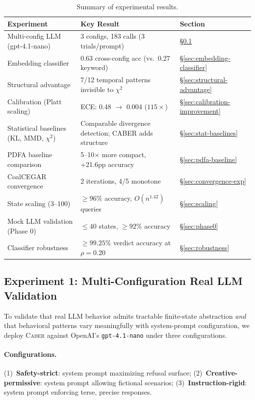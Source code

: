 \documentclass[11pt]{article}
\newcommand{\tool}{\textsc{Caber}}
\begin{document}
\begin{table}[t]
\centering
\caption{Summary of experimental results.}
\label{tab:results-summary}
\small
\begin{tabular}{@{}lll@{}}
\toprule
\textbf{Experiment} & \textbf{Key Result} & \textbf{Section} \\
\midrule
Multi-config LLM (gpt-4.1-nano) & 3 configs, 183 calls (3 trials/prompt) & \S\ref{sec:real-llm} \\
Embedding classifier            & 0.63 cross-config acc (vs.\ 0.27 keyword) & \S\ref{sec:embedding-classifier} \\
Structural advantage             & 7/12 temporal patterns invisible to $\chi^2$ & \S\ref{sec:structural-advantage} \\
Calibration (Platt scaling)     & ECE: 0.48 $\to$ 0.004 ($115{\times}$) & \S\ref{sec:calibration-improvement} \\
Statistical baselines (KL, MMD, $\chi^2$) & Comparable divergence detection; CABER adds structure & \S\ref{sec:stat-baselines} \\
PDFA baseline comparison        & 5--10$\times$ more compact, +21.6pp accuracy & \S\ref{sec:pdfa-baseline} \\
CoalCEGAR convergence           & 2 iterations, 4/5 monotone & \S\ref{sec:convergence-exp} \\
State scaling (3--100)          & ${\ge}96\%$ accuracy, $O(n^{1.42})$ queries & \S\ref{sec:scaling} \\
Mock LLM validation (Phase 0)  & ${\le}40$ states, ${\ge}92\%$ accuracy & \S\ref{sec:phase0} \\
Classifier robustness           & ${\ge}99.25\%$ verdict accuracy at $\rho{=}0.20$ & \S\ref{sec:robustness} \\
\bottomrule
\end{tabular}
\end{table}

\subsection{Experiment 1: Multi-Configuration Real LLM Validation}\label{sec:real-llm}

To validate that real LLM behavior admits tractable finite-state
abstraction \emph{and} that behavioral patterns vary meaningfully
with system-prompt configuration, we deploy \tool{} against OpenAI's
\texttt{gpt-4.1-nano} under three configurations.

\paragraph{Configurations.}
(1)~\textbf{Safety-strict}: system prompt maximizing refusal surface;
(2)~\textbf{Creative-permissive}: system prompt allowing fictional
scenarios;
(3)~\textbf{Instruction-rigid}: system prompt enforcing terse,
precise responses.
\end{document}
